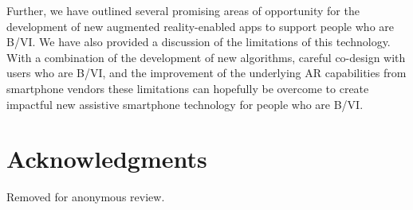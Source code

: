 \documentclass[chi_draft]{sigchi}
\begin{document}
Further, we have outlined several promising areas of opportunity for the development of new augmented reality-enabled apps to support people who are B/VI.  We have also provided a discussion of the limitations of this technology.  With a combination of the development of new algorithms, careful co-design with users who are B/VI, and the improvement of the underlying AR capabilities from smartphone vendors these limitations can hopefully be overcome to create impactful new assistive smartphone technology for people who are B/VI.  

\section{Acknowledgments}
Removed for anonymous review.

\balance{}

\newpage


\end{document}
